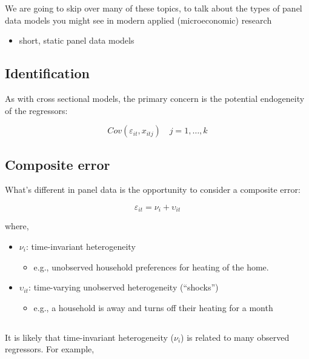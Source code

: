 \documentclass[
  letterpaper,
  DIV=11,
  numbers=noendperiod]{scrartcl}
\providecommand{\tightlist}{%
  \setlength{\itemsep}{0pt}\setlength{\parskip}{0pt}}
\begin{document}
We are going to skip over many of these topics, to talk about the types
of panel data models you might see in modern applied (microeconomic)
research

\begin{itemize}
\tightlist
\item
  short, static panel data models
\end{itemize}

\subsection{Identification}\label{identification-1}

As with cross sectional models, the primary concern is the potential
endogeneity of the regressors:

\[
  Cov(\varepsilon_{it},x_{itj}) \quad j=1,\dots,k 
\]

\subsection{Composite error}\label{composite-error}

What's different in panel data is the opportunity to consider a
composite error:

\[
  \varepsilon_{it}= \nu_{i}+\upsilon_{it}
\]

where,

\begin{itemize}
\item
  \(\nu_{i}\): time-invariant heterogeneity

  \begin{itemize}
  \tightlist
  \item
    e.g., unobserved household preferences for heating of the home.
  \end{itemize}
\item
  \(\upsilon_{it}\): time-varying unobserved heterogeneity (``shocks'')

  \begin{itemize}
  \tightlist
  \item
    e.g., a household is away and turns off their heating for a month
  \end{itemize}
\end{itemize}

\subsection{}\label{section-2}

It is likely that time-invariant heterogeneity (\(\nu_{i}\)) is related
to many observed regressors. For example,
\end{document}
